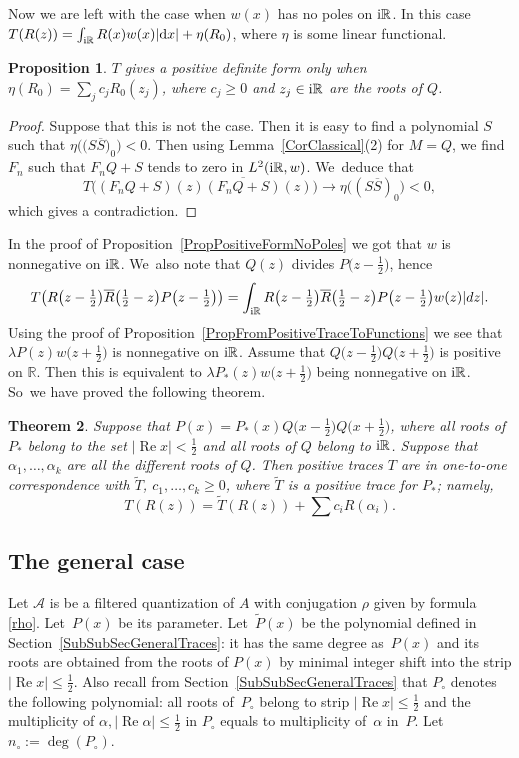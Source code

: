 \documentclass[10pt,a4paper]{amsart}
\newcommand{\RN}{\mathbb{R}} %
\newcommand{\ovl}{\overline}
\newcommand{\mc}[1]{\mathcal{#1}}
\renewcommand{\Re}{\operatorname{Re}}
\newtheorem{Theorem}{Theorem}[section]
\newtheorem{Proposition}[Theorem]{Proposition}
\theoremstyle{definition}
\numberwithin{equation}{section}
\begin{document}
Now we are left with the case when $w(x)$ has no poles on ${\rm i}\RN$. In this case $T(R(z))=\int_{{\rm i}\RN}R(x)w(x)|{\rm d}x|+\eta(R_0)$, where $\eta$ is some linear functional.
\begin{Proposition}
\label{PropIfPositiveThenNoDerivatives}
$T$ gives a positive definite form only when $\eta(R_0)=\sum_{j}c_j R_0(z_j)$, where $c_j\geq 0$ and $z_j\in {\rm i}\mathbb R$ are the roots of $Q$.
\end{Proposition}
\begin{proof}
Suppose that this is not the case. Then it is easy to find a polynomial $S$ such that $\eta\big(\big(S\ovl{S}\big)_0\big)<0$. Then using Lemma~\ref{CorClassical}(2) for $M=Q$, we find $F_n$ such that $F_nQ+S$ tends to zero in $L^2({\rm i}\RN,w)$. We~deduce that
\[
T\big((F_nQ+S)(z)\ovl{(F_nQ+S)}(z)\big)\to \eta\big((S\ovl{S})_0\big)<0,
\]
which gives a contradiction.
\end{proof}

In the proof of Proposition~\ref{PropPositiveFormNoPoles} we got that $w$ is nonnegative on ${\rm i}\RN$. We~also note that $Q(z)$ divides $P\big(z-\tfrac12\big)$, hence
\[
T\big(R\big(z-\tfrac12\big)\ovl{R}\big(\tfrac12-z\big)P\big(z-\tfrac12\big)\big)
=\int_{{\rm i}\RN}R\big(z-\tfrac12\big)\ovl{R}\big(\tfrac12-z\big)P\big(z-\tfrac12\big) w(z) |dz|.
\]
Using the proof of Proposition~\ref{PropFromPositiveTraceToFunctions} we see that $\lambda P(z)w\big(z+\tfrac12\big)$ is nonnegative on ${\rm i}\RN$. Assume that $Q\big(z-\tfrac12\big)Q\big(z+\tfrac12\big)$ is positive on $\RN$. Then this is equivalent to $\lambda P_*(z)w\big(z+\tfrac12\big)$ being nonnegative on ${\rm i}\RN$. So~we have proved the following theorem.

\begin{Theorem}
\label{ThrPositiveDefiniteFormsClosedStrip}
Suppose that $P(x)=P_*(x)Q\big(x-\tfrac{1}{2}\big)Q\big(x+\frac{1}{2}\big)$, where all roots of $P_*$ belong to the set $|\Re x|<\frac{1}{2}$ and all roots of $Q$ belong to ${\rm i}\RN$. Suppose that $\alpha_1,\ldots,\alpha_k$ are all the different roots of $Q$. Then positive traces $T$ are in one-to-one correspondence with $\widetilde{T}$, $c_1,\ldots, c_k\geq 0$, where $\widetilde{T}$ is a positive trace for $P_*$; namely, \[T(R(z))=\widetilde{T}(R(z))+\sum c_i R(\alpha_i).\]
\end{Theorem}

\subsection{The general case}
Let $\mc{A}$ is be a filtered quantization of $A$ with conjugation $\rho$ given by
formula \eqref{rho}. Let~$P(x)$ be its parameter. Let~$\widetilde{P}(x)$ be the polynomial defined in Section~\ref{SubSubSecGeneralTraces}: it has the same degree as~$P(x)$ and its roots are obtained from the roots of $P(x)$ by minimal integer shift into the strip $|\Re x|\leq \frac{1}{2}$.
Also recall from Section~\ref{SubSubSecGeneralTraces}
that $P_\circ$ denotes the following polynomial:
all roots of~$P_\circ$ belong to strip $|\Re x|\leq \frac{1}{2}$ and the multiplicity of $\alpha, |\Re\alpha|\leq \frac{1}{2}$ in $P_\circ$ equals to multiplicity of~$\alpha$ in~$P$. Let~$n_\circ:=\deg(P_\circ)$.
\end{document}
